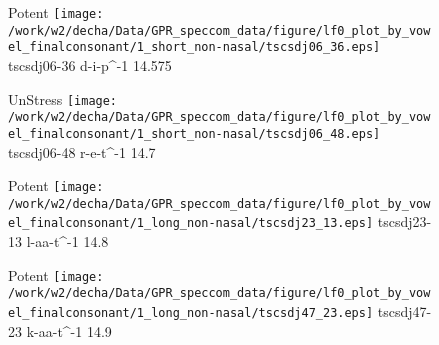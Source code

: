 \documentclass{article}
\begin{document}
\begin{figure}[t]
\begin{minipage}[b]{.24\textwidth}
\colorbox{Apricot}{Potent}
\centering
\texttt{[image: /work/w2/decha/Data/GPR\_speccom\_data/figure/lf0\_plot\_by\_vowel\_finalconsonant/1\_short\_non-nasal/tscsdj06\_36.eps]}
tscsdj06-36 d-i-p\textasciicircum-1 14.575
\end{minipage}
\begin{minipage}[b]{.24\textwidth}
UnStress
\centering
\texttt{[image: /work/w2/decha/Data/GPR\_speccom\_data/figure/lf0\_plot\_by\_vowel\_finalconsonant/1\_short\_non-nasal/tscsdj06\_48.eps]}
tscsdj06-48 r-e-t\textasciicircum-1 14.7
\end{minipage}
\begin{minipage}[b]{.24\textwidth}
\colorbox{Apricot}{Potent}
\centering
\texttt{[image: /work/w2/decha/Data/GPR\_speccom\_data/figure/lf0\_plot\_by\_vowel\_finalconsonant/1\_long\_non-nasal/tscsdj23\_13.eps]}
tscsdj23-13 l-aa-t\textasciicircum-1 14.8
\end{minipage}
\begin{minipage}[b]{.24\textwidth}
\colorbox{Apricot}{Potent}
\centering
\texttt{[image: /work/w2/decha/Data/GPR\_speccom\_data/figure/lf0\_plot\_by\_vowel\_finalconsonant/1\_long\_non-nasal/tscsdj47\_23.eps]}
tscsdj47-23 k-aa-t\textasciicircum-1 14.9
\end{minipage}
\end{figure}
\end{document}

